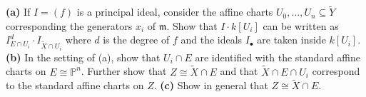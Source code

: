 \documentclass[11pt]{amsart}
\theoremstyle{theorem}
\newcommand{\bP}{\mathbb{P}}
\newcommand{\tld}{\widetilde}
\newcommand{\fram}{\mathfrak{m}}
\begin{document}
\vskip 9pt
{\bf{(a)}}  If $I = (f)$ is a principal ideal, consider the affine charts $U_0, \dots, U_n \subseteq \tld Y$ corresponding the generators $x_i$ of $\fram$.  Show that $I \cdot k[U_i]$ can be written as $I_{E \cap U_i}^d \cdot I_{\tld X \cap U_i}$ where $d$ is the degree of $f$ and the ideals $I_{\bullet}$ are taken inside $k[U_i]$.
\vskip 160pt
{\bf{(b)}}  In the setting of (a), show that $U_i \cap E$ are identified with the standard affine charts on $E \cong \bP^n$.  Further show that $Z \cong \tld X \cap E$ and that ${\tld X \cap E \cap U_i}$ correspond to the standard affine charts on $Z$.
\vskip 160pt
{\bf{(c)}}  Show in general that $Z \cong \tld X \cap E$.
\end{document}
